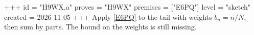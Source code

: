 +++
id = "H9WX.a"
proves = "H9WX"
premises = ["E6PQ"]
level = "sketch"
created = 2026-11-05
+++
Apply \ref{E6PQ} to the tail with weights $b_n = n / N$, then sum by parts. The bound on the weights is still missing.

